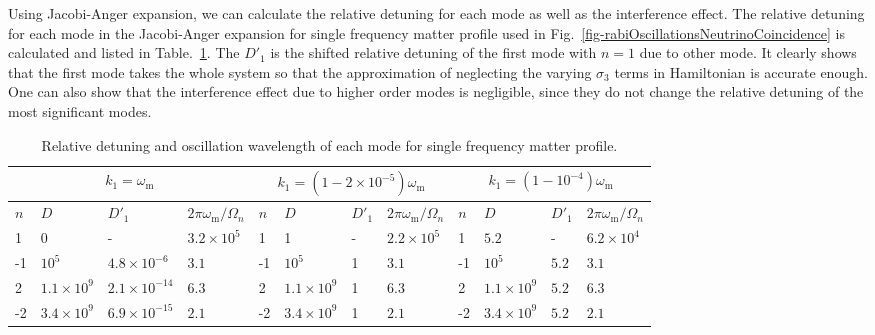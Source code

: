 \documentclass[%
reprint,
 amsmath,amssymb,
 prd,
]{revtex4-1}
\newcommand{\RD}{D}
\begin{document}
Using Jacobi-Anger expansion, we can calculate the relative detuning for each mode as well as the interference effect. The relative detuning for each mode in the Jacobi-Anger expansion for single frequency matter profile used in Fig.~\ref{fig-rabiOscillationsNeutrinoCoincidence} is calculated and listed in Table.~\ref{tab-q-values-single-frequency-example}. The $\RD'_1$ is the shifted relative detuning of the first mode with $n=1$ due to other mode. It clearly shows that the first mode takes the whole system so that the approximation of neglecting the varying $\sigma_3$ terms in Hamiltonian is accurate enough. One can also show that the interference effect due to higher order modes is negligible, since they do not change the relative detuning of the most significant modes.






\begin{table}
\caption{\label{tab-q-values-single-frequency-example}Relative detuning and oscillation wavelength of each mode for single frequency matter profile.} 
\begin{ruledtabular} 
\begin{tabular}{llll|llll|llll}
 \multicolumn{4}{c|}{$k_1=\omega_{\mathrm m}$} & \multicolumn{4}{c|}{$k_1=(1-2\times 10^{-5})\omega_{\mathrm{m}}$} & \multicolumn{4}{c}{$k_1=(1-10^{-4})\omega_{\mathrm m}$} \\
\hline
   $n$ & $\RD$ & $\RD'_1$  & $2\pi\omega_{\mathrm m}/\Omega_n$ & $n$ & $\RD$ & $\RD'_1$ & $2\pi\omega_{\mathrm m}/\Omega_n$ & $n$ & $\RD$ & $\RD'_1$ & $2\pi\omega_{\mathrm m}/\Omega_n$  \\
\hline 
 1 &	0  & - &   $3.2\times10^5$   & 1 &	1 &  -  &   $2.2\times 10^5$       & 1   &	$5.2$ &  - & $6.2\times10^4$   \\
-1 &	$10^5$ &  $4.8\times 10^{-6}$  &   $3.1$     &     -1 &	$10^5$ &   1  &   $3.1$               &  -1 &	$10^5$  & $5.2$ & $3.1$  \\
2 &	$1.1\times 10^9$  &   $2.1\times 10^{-14}$  &   $6.3$    &  2 & 	$1.1\times 10^9$ &  1  &    $6.3$   &  2  &	$1.1\times 10^9$  &  $5.2$  & $6.3$  \\
-2 &	$3.4\times 10^9$  & $6.9\times 10^{-15}$ & $2.1$ &    -2 &	$3.4\times10^9$ &  1  &  $2.1$          & -2  &	$3.4\times 10^9$ & $5.2$ &  $2.1$  \\
\end{tabular} 
\end{ruledtabular} 
\end{table}
\end{document}
